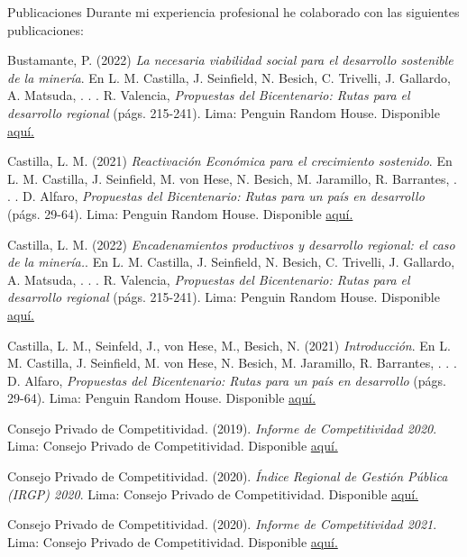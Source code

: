 \documentclass{resume} %
\begin{document}
\begin{rSection}{Publicaciones}
Durante mi experiencia profesional he colaborado con las siguientes publicaciones:
\item Bustamante, P. (2022) \emph{La necesaria viabilidad social para el desarrollo sostenible de la minería}. En L. M. Castilla, J. Seinfield, N. Besich, C. Trivelli, J. Gallardo, A. Matsuda, . . . R. Valencia, \textit{Propuestas del Bicentenario: Rutas para el desarrollo regional} (págs. 215-241). Lima: Penguin Random House. Disponible \href{https://www.casadellibro.com/ebook-propuestas-del-bicentenario-ebook/9786125068026/13125397}{aquí.} 
\item Castilla, L. M. (2021) \emph{Reactivación Económica para el crecimiento sostenido}. En L. M. Castilla, J. Seinfield, M. von Hese, N. Besich, M. Jaramillo, R. Barrantes, . . . D. Alfaro, \textit{Propuestas del Bicentenario: Rutas para un país en desarrollo} (págs. 29-64). Lima: Penguin Random House. Disponible \href{https://www.casadellibro.com/ebook-propuestas-del-bicentenario-ebook/9786124272813/12336851}{aquí.}
\item Castilla, L. M. (2022) \emph{Encadenamientos productivos y desarrollo regional: el caso de la minería.}.  En L. M. Castilla, J. Seinfield, N. Besich, C. Trivelli, J. Gallardo, A. Matsuda, . . . R. Valencia, \textit{Propuestas del Bicentenario: Rutas para el desarrollo regional} (págs. 215-241). Lima: Penguin Random House. Disponible \href{https://www.casadellibro.com/ebook-propuestas-del-bicentenario-ebook/9786125068026/13125397}{aquí.} 
\item Castilla, L. M., Seinfeld, J., von Hese, M., Besich, N. (2021) \emph{Introducción}. En L. M. Castilla, J. Seinfield, M. von Hese, N. Besich, M. Jaramillo, R. Barrantes, . . . D. Alfaro, \textit{Propuestas del Bicentenario: Rutas para un país en desarrollo} (págs. 29-64). Lima: Penguin Random House. Disponible \href{https://www.casadellibro.com/ebook-propuestas-del-bicentenario-ebook/9786124272813/12336851}{aquí.}
\item Consejo Privado de Competitividad. (2019). \emph{Informe de Competitividad 2020}. Lima: Consejo Privado de Competitividad. Disponible \href{https://www.compite.pe/wp-content/uploads/2019/11/CPC_Peru_INC-2020_Libro-Web-Paginas.pdf}{aquí.}
\item Consejo Privado de Competitividad. (2020). \emph{Índice Regional de Gestión Pública (IRGP) 2020}. Lima: Consejo Privado de Competitividad. Disponible \href{https://www.compite.pe/wp-content/uploads/2020/07/IRGP-2020-version-final.pdf}{aquí.}
\item Consejo Privado de Competitividad. (2020). \emph{Informe de Competitividad 2021}. Lima: Consejo Privado de Competitividad. Disponible \href{https://www.compite.pe/wp-content/uploads/2021/01/Informe-de-Competitividad-2021-CPC.pdf}{aquí.}
\end{rSection} 
\end{document}
